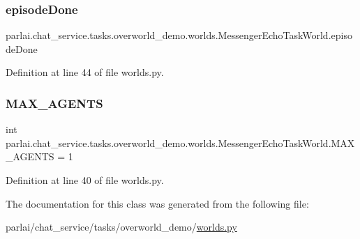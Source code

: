 \subsubsection{\texorpdfstring{episode\+Done}{episodeDone}}
{\footnotesize\ttfamily parlai.\+chat\+\_\+service.\+tasks.\+overworld\+\_\+demo.\+worlds.\+Messenger\+Echo\+Task\+World.\+episode\+Done}



Definition at line 44 of file worlds.\+py.

\mbox{\label{classparlai_1_1chat__service_1_1tasks_1_1overworld__demo_1_1worlds_1_1MessengerEchoTaskWorld_a2bf81ef856313f96749fd0dbd7049582}} 
\subsubsection{\texorpdfstring{M\+A\+X\+\_\+\+A\+G\+E\+N\+TS}{MAX\_AGENTS}}
{\footnotesize\ttfamily int parlai.\+chat\+\_\+service.\+tasks.\+overworld\+\_\+demo.\+worlds.\+Messenger\+Echo\+Task\+World.\+M\+A\+X\+\_\+\+A\+G\+E\+N\+TS = 1\hspace{0.3cm}{\ttfamily [static]}}



Definition at line 40 of file worlds.\+py.



The documentation for this class was generated from the following file\+:\begin{DoxyCompactItemize}
\item 
parlai/chat\+\_\+service/tasks/overworld\+\_\+demo/\hyperlink{parlai_2chat__service_2tasks_2overworld__demo_2worlds_8py}{worlds.\+py}\end{DoxyCompactItemize}
